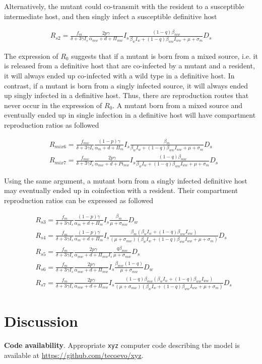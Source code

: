 \documentclass{article}
\begin{document}
Alternatively, the mutant could co-transmit with the resident to a susceptible intermediate host, and then singly infect a susceptible definitive host

\begin{align}
R_{s2} = \frac{f_m}{\delta +3 \gamma  I_s} \frac{2 p \gamma }{\alpha_{mw} + d + \Pi_{mw}} I_s \frac{ (1-q)\beta_{mw}}{\beta_w I_w +  (1- q) \beta_{ww} I_{ww} +\mu +\sigma_m} D_s
\end{align}

The expression of $R_0$ suggests that if a mutant is born from a mixed source, i.e. it is released from a definitive host that are co-infected by a mutant and a resident, it will always ended up co-infected with a wild type in a definitive host. In contrast, if a mutant is born from a singly infected source, it will always ended up singly infected in a definitive host. Thus, there are reproduction routes that never occur in the expression of $R_0$. A mutant born from a mixed source and eventually ended up in single infection in a definitive host will have compartment reproduction ratios as followed

\begin{align}
& R_{mix6} = \frac{f_{mw}}{\delta + 3 \gamma I_s} \frac{(1-p) \gamma}{\alpha_m + d + \Pi_m} I_s \frac{\beta_m}{\beta_w I_w + (1-q) \beta_{ww} I_{ww} + \mu + \sigma_m} D_s \\
& R_{mix7} = \frac{f_{mw}}{\delta + 3 \gamma I_s} \frac{2 p \gamma}{\alpha_{mw} + d + Pi_{mw}} I_s \frac{(1-q)\beta_{mw}}{\beta_w I_w + (1-q) \beta_{ww} I_{ww} + \mu + \sigma_m} D_s
\end{align}

Using the same argument, a mutant born from a singly infected definitive host may eventually ended up in coinfection with a resident. Their compartment reproduction ratios can be expressed as followed

\begin{align}
& R_{s3} = \frac{f_m}{\delta + 3 \gamma I_s}  \frac{(1-p) \gamma}{\alpha_m + d + \Pi_m} I_s \frac{\beta_m }{\mu +\sigma_{mw}} D_w \\
& R_{s4} = \frac{f_{m}}{\delta +3 \gamma  I_s} \frac{(1-p) \gamma}{\alpha_m + d + \Pi_m} I_s \frac{\beta_m (\beta_w I_w + (1-q) \beta_{ww} I_{ww})}{(\mu + \sigma_{mw}) (\beta_w I_w +  (1- q)\beta_{ww} I_{ww} + \mu + \sigma_m)} D_s \\
& R_{s5} = \frac{f_{m}}{\delta + 3 \gamma  I_s} \frac{2 p \gamma}{\alpha_{mw} + d + \Pi_{mw} I_s} \frac{q \beta_{mw}}{\mu + \sigma_{mw}} D_s \\
& R_{s6} = \frac{f_{m}}{\delta +3 \gamma  I_s} \frac{2 p \gamma}{\alpha_{mw} + d + \Pi_{mw}} I_s \frac{\beta_{mw} (1-q)}{\mu + \sigma_{mw}} D_w \\
& R_{s7} = \frac{f_{m}}{\delta + 3 \gamma  I_s} \frac{2 p \gamma }{\alpha_{mw} + d + \Pi_{mw}} I_s \frac{(1-q) \beta_{mw}  (\beta_w I_w +(1-q) \beta_{ww} I_{ww} )}{(\mu +\sigma_{mw}) (\beta_w I_w +  (1-q)\beta_{ww} I_{ww} +\mu + \sigma_m)} D_s
\end{align}
\section{Discussion}

\textbf{Code availability}.
Appropriate {\tt{xyz}} computer code describing the model is available at {\url{https://github.com/tecoevo/xyz}}.







\appendix
\end{document}
